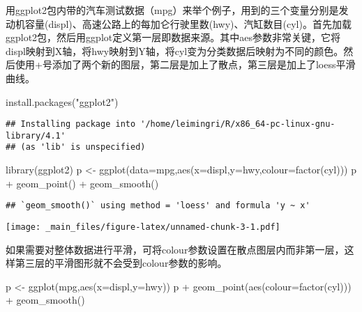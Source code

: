 \documentclass[
]{book}
\newenvironment{Shaded}{\begin{snugshade}}{\end{snugshade}}
\newcommand{\AttributeTok}[1]{\textcolor[rgb]{0.77,0.63,0.00}{#1}}
\newcommand{\FunctionTok}[1]{\textcolor[rgb]{0.00,0.00,0.00}{#1}}
\newcommand{\NormalTok}[1]{#1}
\newcommand{\OtherTok}[1]{\textcolor[rgb]{0.56,0.35,0.01}{#1}}
\newcommand{\SpecialCharTok}[1]{\textcolor[rgb]{0.00,0.00,0.00}{#1}}
\newcommand{\StringTok}[1]{\textcolor[rgb]{0.31,0.60,0.02}{#1}}
\begin{document}
用ggplot2包内带的汽车测试数据（mpg）来举个例子，用到的三个变量分别是发动机容量(displ)、高速公路上的每加仑行驶里数(hwy)、汽缸数目(cyl)。首先加载ggplot2包，然后用ggplot定义第一层即数据来源。其中aes参数非常关键，它将displ映射到X轴，将hwy映射到Y轴，将cyl变为分类数据后映射为不同的颜色。然后使用+号添加了两个新的图层，第二层是加上了散点，第三层是加上了loess平滑曲线。

\begin{Shaded}
\begin{Highlighting}[]
\FunctionTok{install.packages}\NormalTok{(}\StringTok{"ggplot2"}\NormalTok{)}
\end{Highlighting}
\end{Shaded}

\begin{verbatim}
## Installing package into '/home/leimingri/R/x86_64-pc-linux-gnu-library/4.1'
## (as 'lib' is unspecified)
\end{verbatim}

\begin{Shaded}
\begin{Highlighting}[]
\FunctionTok{library}\NormalTok{(ggplot2)}
\NormalTok{p }\OtherTok{\textless{}{-}} \FunctionTok{ggplot}\NormalTok{(}\AttributeTok{data=}\NormalTok{mpg,}\FunctionTok{aes}\NormalTok{(}\AttributeTok{x=}\NormalTok{displ,}\AttributeTok{y=}\NormalTok{hwy,}\AttributeTok{colour=}\FunctionTok{factor}\NormalTok{(cyl)))}
\NormalTok{p }\SpecialCharTok{+} \FunctionTok{geom\_point}\NormalTok{() }\SpecialCharTok{+} \FunctionTok{geom\_smooth}\NormalTok{()}
\end{Highlighting}
\end{Shaded}

\begin{verbatim}
## `geom_smooth()` using method = 'loess' and formula 'y ~ x'
\end{verbatim}

\texttt{[image: \_main\_files/figure-latex/unnamed-chunk-3-1.pdf]}

如果需要对整体数据进行平滑，可将colour参数设置在散点图层内而非第一层，这样第三层的平滑图形就不会受到colour参数的影响。

\begin{Shaded}
\begin{Highlighting}[]
\NormalTok{p }\OtherTok{\textless{}{-}} \FunctionTok{ggplot}\NormalTok{(mpg,}\FunctionTok{aes}\NormalTok{(}\AttributeTok{x=}\NormalTok{displ,}\AttributeTok{y=}\NormalTok{hwy))}
\NormalTok{p }\SpecialCharTok{+} \FunctionTok{geom\_point}\NormalTok{(}\FunctionTok{aes}\NormalTok{(}\AttributeTok{colour=}\FunctionTok{factor}\NormalTok{(cyl))) }\SpecialCharTok{+} \FunctionTok{geom\_smooth}\NormalTok{()}
\end{Highlighting}
\end{Shaded}
\end{document}
